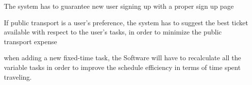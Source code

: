 \begin{requirementList}
    \item The system has to guarantee new user signing up with a proper sign up page   
    
    \item If public transport is a user's preference, the system has to suggest the best ticket available with respect to the user's tasks, in order to minimize the public transport expense
    
    \item when adding a new fixed-time task, the Software will have to recalculate all the variable tasks in order to improve the schedule efficiency in terms of time spent traveling.
    
    \item 
\end{requirementList}